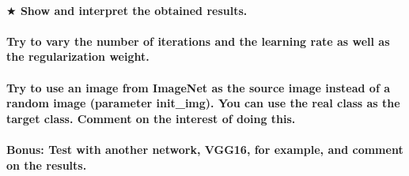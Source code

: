 \paragraph*{$ \bigstar $ Show and interpret the obtained results.}
\paragraph*{Try to vary the number of iterations and the learning rate as well as the regularization weight.}
\paragraph*{Try to use an image from ImageNet as the source image instead of a random image (parameter init_img). You can use the real class as the target class. Comment on the interest of doing this.}
\paragraph*{\textbf{Bonus:} Test with another network, VGG16, for example, and comment on the results.}